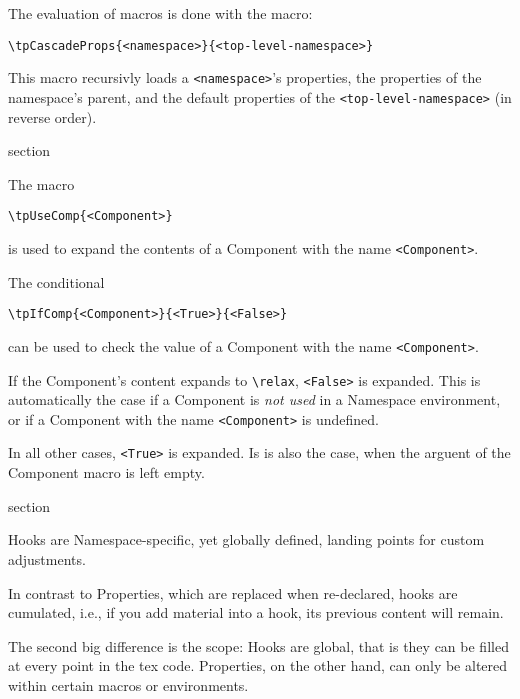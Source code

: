 The evaluation of macros is done with the macro:
\begin{lstlisting}[style=tex]
\tpCascadeProps{<namespace>}{<top-level-namespace>}
\end{lstlisting}
This macro recursivly loads a \lstinline{<namespace>}'s properties, the
properties of the namespace's parent, and the default properties of the
\lstinline{<top-level-namespace>} (in reverse order).

\begin{Heading}[label=sec:common:components]{section}
\end{Heading}

The macro
\begin{lstlisting}[style=tex]
\tpUseComp{<Component>}
\end{lstlisting}
is used to expand the contents of a Component with the name
\lstinline{<Component>}.

The conditional
\begin{lstlisting}[style=tex]
\tpIfComp{<Component>}{<True>}{<False>}
\end{lstlisting}
can be used to check the value of a Component with the name
\lstinline{<Component>}.

If the Component's content expands to \lstinline{\relax},
\lstinline{<False>} is expanded. This is automatically the case if a
Component is \textit{not used} in a Namespace environment, or if a
Component with the name \lstinline{<Component>} is undefined.

In all other cases, \lstinline{<True>} is expanded. Is is also the
case, when the arguent of the Component macro is left empty.

\begin{Heading}[label=sec:common:components]{section}
\end{Heading}

Hooks are Namespace-specific, yet globally defined, landing points for
custom adjustments.

In contrast to Properties, which are replaced when re-declared, hooks
are cumulated, i.e., if you add material into a hook, its previous
content will remain.

The second big difference is the scope: Hooks are global, that is they
can be filled at every point in the tex code. Properties, on the other
hand, can only be altered within certain macros or environments.

